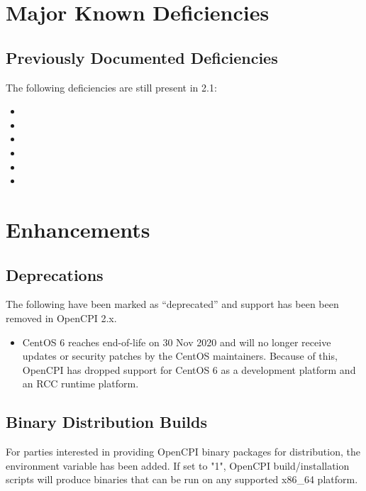 \section{Major Known Deficiencies}
\label{sec:21_bugs}

\subsection{Previously Documented Deficiencies}
The following deficiencies are still present in 2.1:
\begin{itemize}
\setlength\itemsep{0em} %
\item {}
\item {}
\item {}
\item {}
\item {}
\item {}
\end{itemize}


\def\ocpiversion{v2.0.0}
\section{Enhancements}

\subsection{Deprecations}
\label{sec:20_deprecations}
The following have been marked as ``deprecated'' and support has been been removed in OpenCPI 2.x.
\begin{itemize}
\item CentOS 6 reaches end-of-life on 30 Nov 2020 and will no longer receive updates or security patches by the CentOS maintainers. Because of this, OpenCPI has dropped support for CentOS 6 as a development platform and an RCC runtime platform.
\end{itemize}

\subsection{Binary Distribution Builds}
\label{sec:20_binary_distribution}
For parties interested in providing OpenCPI binary packages for distribution, the  environment variable has been added.  If set to "1", OpenCPI build/installation scripts will produce binaries that can be run on any supported x86\_{}64 platform.

